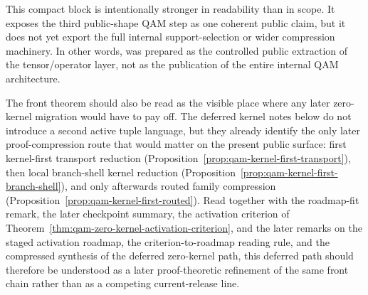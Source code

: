 \begin{remark}
This compact block is intentionally stronger in readability than in scope. It exposes the third public-shape QAM step as one coherent public claim, but it does not yet export the full internal support-selection or wider compression machinery. In other words,  was prepared as the controlled public extraction of the tensor/operator layer, not as the publication of the entire internal QAM architecture.
\end{remark}

\begin{remark}
The front theorem should also be read as the visible place where any later zero-kernel migration would have to pay off. The deferred kernel notes below do not introduce a second active tuple language, but they already identify the only later proof-compression route that would matter on the present public surface: first kernel-first transport reduction (Proposition~\ref{prop:qam-kernel-first-transport}), then local branch-shell kernel reduction (Proposition~\ref{prop:qam-kernel-first-branch-shell}), and only afterwards routed family compression (Proposition~\ref{prop:qam-kernel-first-routed}). Read together with the roadmap-fit remark, the later checkpoint summary, the activation criterion of Theorem~\ref{thm:qam-zero-kernel-activation-criterion}, and the later remarks on the staged activation roadmap, the criterion-to-roadmap reading rule, and the compressed synthesis of the deferred zero-kernel path, this deferred path should therefore be understood as a later proof-theoretic refinement of the same front chain rather than as a competing current-release line.
\end{remark}

